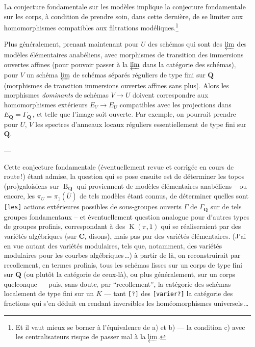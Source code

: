 \documentclass[12pt,twoside]{report}
\newcommand{\K}{\operatorname{K}}
\renewcommand{\bar}{\overline}
\DeclareMathOperator{\B}{B}
\renewcommand{\to}{\longrightarrow}
\theoremstyle{plain}
\theoremstyle{definition}
\begin{document}
La conjecture fondamentale sur les modèles implique la conjecture
fondamentale sur les corps, à condition de prendre soin, dans cette
dernière, de se limiter aux homomorphismes compatibles aux
filtrations modéliques.\footnote{Et il vaut mieux se borner à
l'équivalence de a) et b) --- la condition c) avec les
centralisateurs risque de passer mal à la $\varprojlim$.}

Plus généralement, prenant maintenant pour $U$ des schémas qui sont
des $\varprojlim$ des modèles élémentaires anabéliens, avec
morphismes de transition des immersions ouvertes affines (pour
pouvoir passer à la $\varprojlim$ dans la catégorie des schémas),
pour $V$ un schéma $\varprojlim$ de schémas séparés réguliers de type
fini sur $\mathbf{Q}$ (morphismes de transition immersions ouvertes affines
sans plus). Alors les morphismes \emph{dominants} de schémas $V \to
U$ doivent correspondre aux homomorphismes extérieurs  $E_V \to E_U$
compatibles avec les projections dans $E_\mathbf{Q} = \Gamma_\mathbf{Q}\,$, et telle
que l'image soit ouverte. Par exemple, on pourrait prendre pour $U$,
$V$ les spectres d'anneaux locaux réguliers essentiellement%
de type fini sur $\mathbf{Q}$.

\begin{center}
---
\end{center}

Cette conjecture fondamentale (éventuellement revue et corrigée en
cours de route\,!) étant admise, la question qui se pose ensuite est
de déterminer les topos (pro)galoisiens sur $\B_{\mathbf{Q}}$ qui proviennent
de modèles élémentaires anabéliens -- ou encore, les $\pi_U =
\pi_1(\bar{U})$ de tels modèles étant connus, de déterminer quelles
sont
{\tt [les]} actions extérieures possibles de sous-groupes ouverts
$\Gamma$ de $\Gamma_{\mathbf{Q}}$ sur de tels groupes fondamentaux -- et
éventuellement question analogue pour d'autres types de groupes
profinis, correspondant à des $\K(\pi, 1)$ qui se réaliseraient par
des variétés algébriques (sur $\mathbf{C}$, disons), mais pas par des
variétés élémentaires. (J'ai en vue autant des variétés modulaires,
tels que, notamment, des variétés modulaires pour les courbes
algébriques\,\dots) à partir de là, on reconstruirait par
recollement, en termes profinis, tous les schémas lisses sur un corps
de type fini sur $\mathbf{Q}$ (ou plutôt la catégorie de ceux-là), ou plus
généralement, sur un corps quelconque --- puis, sans doute, par
``recollement'', la catégorie des schémas localement de type fini sur
un $K$ --- tant {\tt [?]} des {\tt [varier?]} la catégorie des
fractions qui s'en déduit en rendant inversibles les homéomorphismes
universels\,\dots
\end{document}
